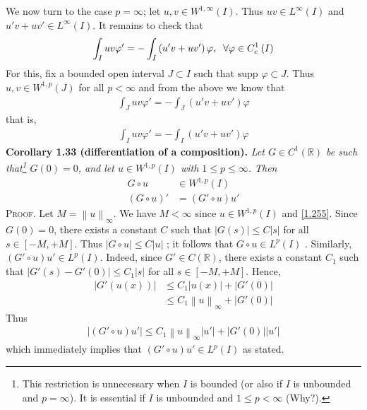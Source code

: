 \documentclass[a4paper,oneside]{book}
\numberwithin{equation}{chapter}
\begin{document}
We now turn to the case $p=\infty$; let $u,v\in W^{1,\infty}\left(I\right)$. Thus $uv\in L^{\infty}\left(I\right)$ and $u'v+uv'\in L^{\infty}\left(I\right)$. It remains to check that
\begin{align}
\int_I {uv\varphi '}  =  - \int_I {\left( {u'v + uv'} \right)\varphi } ,\hspace{0.2cm}\forall \varphi  \in C_c^1\left( I \right)
\end{align}
For this, fix a bounded open interval $J\subset I$ such that $\mbox{supp } \varphi \subset J$. Thus $u,v\in W^{1,p}\left(J\right)$ for all $p<\infty$ and from the above we know that
\begin{align}
\int_J {uv\varphi '}  =  - \int_J {\left( {u'v + uv'} \right)\varphi } 
\end{align}
that is,
\begin{align}
\int_I {uv\varphi '}  =  - \int_I {\left( {u'v + uv'} \right)\varphi } 
\end{align}
\textbf{Corollary 1.33 (differentiation of a composition).} \textit{Let $G \in C^1\left(\mathbb{R}\right)$ be such that\footnote{This restriction is unnecessary when $I$ is bounded (or also if $I$ is unbounded and $p=\infty$). It is essential if $I$ is unbounded and $1\le p<\infty$ (Why?).} $G\left(0\right)=0$, and let $u\in W^{1,p}\left(I\right)$ with $1\le p \le \infty$. Then}
\begin{align}
G \circ u &\in {W^{1,p}}\left( I \right)\\
\left( {G \circ u} \right)' &= \left( {G' \circ u} \right)u'
\end{align}
\textsc{Proof.} Let $M = {\left\| u \right\|_\infty }$. We have $M<\infty$ since $u\in W^{1,p}\left(I\right)$ and \eqref{1.255}. Since $G\left(0\right)=0$, there exists a constant $C$ such that $\left| {G\left( s \right)} \right| \le C\left| s \right|$ for all $s\in \left[-M,+M\right]$. Thus $\left| {G \circ u} \right| \le C\left| u \right|$ ; it follows that $G \circ u \in {L^p}\left( I \right)$ . Similarly, $\left( {G' \circ u} \right)u' \in {L^p}\left( I \right)$. Indeed, since $G' \in C\left(\mathbb{R}\right)$, there exists a constant $C_1$ such that $\left| {G'\left( s \right) - G'\left( 0 \right)} \right| \le {C_1}\left| s \right|$ for all $s\in \left[-M,+M\right]$. Hence,
\begin{align}
\left| {G'\left( {u\left( x \right)} \right)} \right| &\le {C_1}\left| {u\left( x \right)} \right| + \left| {G'\left( 0 \right)} \right|\\
 &\le {C_1}{\left\| u \right\|_\infty } + \left| {G'\left( 0 \right)} \right|
\end{align}
Thus
\begin{align}
\left| {\left( {G' \circ u} \right)u'} \right| \le {C_1}{\left\| u \right\|_\infty }\left| {u'} \right| + \left| {G'\left( 0 \right)} \right|\left| {u'} \right|
\end{align}
which immediately implies that $\left( {G' \circ u} \right)u' \in {L^p}\left( I \right)$ as stated. 
\end{document}
